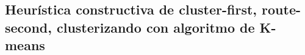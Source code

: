 \subsection{Heurística constructiva de cluster-first, route-second, clusterizando con algoritmo de K-means}
